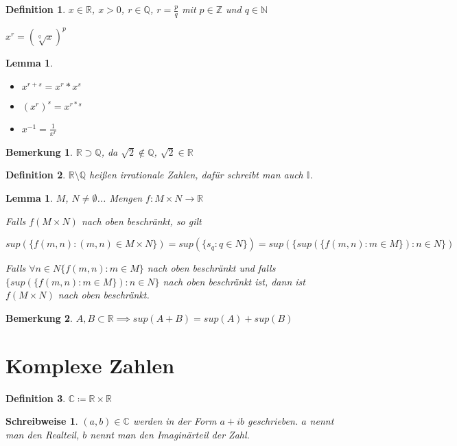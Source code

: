 \documentclass[twocolumn]{article}
\newtheorem{lemma}[theorem]{Lemma}
\newtheorem{definition}{Definition}[section]
\newtheorem*{remark}{Bemerkung}
\newtheorem*{schreibweise}{Schreibweise}
\begin{document}
\begin{definition}
	$x \in \mathbb{R}$, $x>0$, $r \in \mathbb{Q}$, $r=\frac{p}{q}$ mit $p \in \mathbb{Z}$ und $q \in \mathbb{N}$
	
	$x^{r}=(\sqrt[q]{x})^{p}$
\end{definition}
	
\begin{lemma}
	\begin{itemize}
		\item $x^{r+s}=x^{r}*x^{s}$
		\item $(x^{r})^{s}=x^{r*s}$
		\item $x^{-1}=\frac{1}{x^{r}}$
	\end{itemize}
\end{lemma}	

\begin{remark}
	$\mathbb{R} \supset \mathbb{Q}$, da $\sqrt{2} \notin \mathbb{Q}$, $\sqrt{2} \in \mathbb{R}$
\end{remark}

\begin{definition}
	$\mathbb{R}\setminus\mathbb{Q}$ heißen irrationale Zahlen, dafür schreibt man auch $\mathbb{I}$.
\end{definition}

\begin{lemma}
	$M$, $N \neq \emptyset$... Mengen $f:M\times N \rightarrow \mathbb{R}$
	
	Falls $f(M\times N)$ nach oben beschränkt, so gilt
	
	$sup(\{f(m,n) : (m,n) \in M \times N\})=sup(\{s_{q}:q \in N\})=sup(\{sup(\{f(m,n):m \in M\}) : n \in N\})$
	
	Falls $\forall n \in N \{f(m,n):m \in M\}$ nach oben beschränkt und falls $\{sup(\{f(m,n):m \in M\}) : n \in N\}$ nach oben beschränkt ist, dann ist $f(M\times N)$ nach oben beschränkt.
\end{lemma}

\begin{remark}
	$A,B \subset \mathbb{R} \implies sup(A+B)=sup(A)+sup(B)$
\end{remark}

\section{Komplexe Zahlen}
\begin{definition}
	$\mathbb{C}\coloneqq \mathbb{R}\times\mathbb{R}$
\end{definition}

\begin{schreibweise}
	$(a,b) \in \mathbb{C}$ werden in der Form $a+ib$ geschrieben. $a$ nennt man den Realteil, $b$ nennt man den Imaginärteil der Zahl.
\end{schreibweise}
\end{document}
